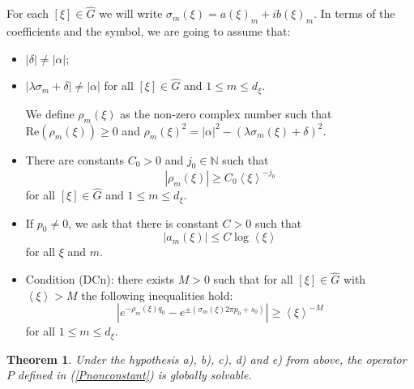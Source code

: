 \documentclass[sn-mathphys-num]{sn-jnl}%
\numberwithin{equation}{section}
\theoremstyle{thmstyleone}
\newtheorem{theorem}{Theorem}[section]%
\theoremstyle{thmstyletwo}
\theoremstyle{thmstylethree}
\renewcommand{\Re}{\textrm{Re}}
\def\jp#1{{\left\langle{#1}\right\rangle}}
\begin{document}
For each $[\xi]\in \widehat{G}$ we will write $\sigma_m(\xi)=a(\xi)_m+ib(\xi)_m$. In terms of the coefficients and the symbol, we are going to assume that:
\begin{itemize}
	\item[a)] $|\delta|\neq |\alpha|$;
	\item[b)] $|\lambda \sigma_m +\delta|\neq |\alpha|$ for all $[\xi]\in \widehat{G}$ and $1\leq m \leq d_\xi$. 

	We define $\rho_m(\xi)$ as the non-zero complex number such that $\Re(\rho_m(\xi))\geq 0$ and $\rho_m(\xi)^2 =|\alpha|^2-(\lambda \sigma_m(\xi)+\delta)^2$. 
	\item[c)] There are constants $C_0>0$ and $j_0 \in \mathbb{N}$ such that
	\begin{equation}\label{DC_rho} 
	\left | \rho_m(\xi) \right| \geq C_0 \jp{\xi}^{-j_0}
	\end{equation} 
	for all $[\xi] \in \widehat{G}$ and $1 \leq m \leq d_\xi$.
	\item[d)] If $p_0\neq 0$, we ask that there is constant $C>0$ such that 
	\begin{equation}\label{log} 
	|a_m(\xi)| \leq C \log \jp{\xi} 
	\end{equation}
	for all $\xi$ and $m$.
	\item[e)] Condition (DCn): there exists $M>0$ such that for all $[\xi]\in \widehat{G}$ with $\jp{\xi}>M$ the following inequalities hold:
	\begin{equation}\label{DCn}
		\left|  e^{-\rho_m(\xi)q_0}-e^{\pm(\sigma_m(\xi)2\pi p_0 +s_0)}\right|\geq \jp{\xi}^{-M}
	\end{equation}
	for all $1 \leq m \leq d_\xi$.
\end{itemize}

\begin{theorem}\label{mainthm} Under the hypothesis a), b), c), d) and e) from above, the operator $P$ defined in (\ref{Pnonconstant}) is globally solvable.
\end{theorem}
\end{document}
